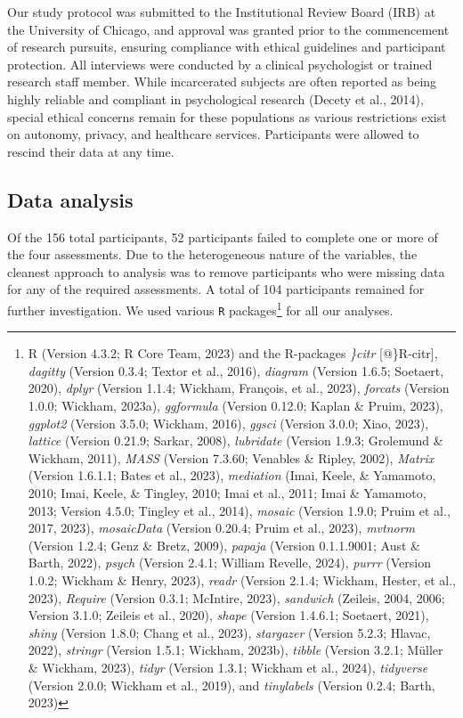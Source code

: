 \documentclass[
  man,floatsintext]{apa7}
\begin{document}
Our study protocol was submitted to the Institutional Review Board (IRB) at the University of Chicago, and approval was granted prior to the commencement of research pursuits, ensuring compliance with ethical guidelines and participant protection. All interviews were conducted by a clinical psychologist or trained research staff member. While incarcerated subjects are often reported as being highly reliable and compliant in psychological research (Decety et al., 2014), special ethical concerns remain for these populations as various restrictions exist on autonomy, privacy, and healthcare services. Participants were allowed to rescind their data at any time.

\hypertarget{data-analysis}{%
\subsection{Data analysis}\label{data-analysis}}

Of the 156 total participants, 52 participants failed to complete one or more of the four assessments. Due to the heterogeneous nature of the variables, the cleanest approach to analysis was to remove participants who were missing data for any of the required assessments. A total of 104 participants remained for further investigation. We used various \texttt{R} packages\footnote{R (Version 4.3.2; R Core Team, 2023) and the R-packages \emph{\}citr} {[}@\}R-citr{]}, \emph{dagitty} (Version 0.3.4; Textor et al., 2016), \emph{diagram} (Version 1.6.5; Soetaert, 2020), \emph{dplyr} (Version 1.1.4; Wickham, François, et al., 2023), \emph{forcats} (Version 1.0.0; Wickham, 2023a), \emph{ggformula} (Version 0.12.0; Kaplan \& Pruim, 2023), \emph{ggplot2} (Version 3.5.0; Wickham, 2016), \emph{ggsci} (Version 3.0.0; Xiao, 2023), \emph{lattice} (Version 0.21.9; Sarkar, 2008), \emph{lubridate} (Version 1.9.3; Grolemund \& Wickham, 2011), \emph{MASS} (Version 7.3.60; Venables \& Ripley, 2002), \emph{Matrix} (Version 1.6.1.1; Bates et al., 2023), \emph{mediation} (Imai, Keele, \& Yamamoto, 2010; Imai, Keele, \& Tingley, 2010; Imai et al., 2011; Imai \& Yamamoto, 2013; Version 4.5.0; Tingley et al., 2014), \emph{mosaic} (Version 1.9.0; Pruim et al., 2017, 2023), \emph{mosaicData} (Version 0.20.4; Pruim et al., 2023), \emph{mvtnorm} (Version 1.2.4; Genz \& Bretz, 2009), \emph{papaja} (Version 0.1.1.9001; Aust \& Barth, 2022), \emph{psych} (Version 2.4.1; William Revelle, 2024), \emph{purrr} (Version 1.0.2; Wickham \& Henry, 2023), \emph{readr} (Version 2.1.4; Wickham, Hester, et al., 2023), \emph{Require} (Version 0.3.1; McIntire, 2023), \emph{sandwich} (Zeileis, 2004, 2006; Version 3.1.0; Zeileis et al., 2020), \emph{shape} (Version 1.4.6.1; Soetaert, 2021), \emph{shiny} (Version 1.8.0; Chang et al., 2023), \emph{stargazer} (Version 5.2.3; Hlavac, 2022), \emph{stringr} (Version 1.5.1; Wickham, 2023b), \emph{tibble} (Version 3.2.1; Müller \& Wickham, 2023), \emph{tidyr} (Version 1.3.1; Wickham et al., 2024), \emph{tidyverse} (Version 2.0.0; Wickham et al., 2019), and \emph{tinylabels} (Version 0.2.4; Barth, 2023)} for all our analyses.
\end{document}
